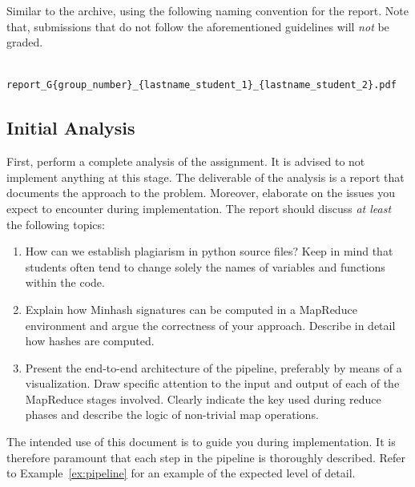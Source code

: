 \documentclass[11pt]{article}
\theoremstyle{definition}
\begin{document}
Similar to the archive, using the following naming convention for the report. Note that, submissions that do not follow the aforementioned guidelines will \emph{not} be graded.

\begin{verbatim}
	report_G{group_number}_{lastname_student_1}_{lastname_student_2}.pdf
\end{verbatim}

\subsection{Initial Analysis}

First, perform a complete analysis of the assignment. It is advised to not implement anything at this stage. The deliverable of the analysis is a report that documents the approach to the problem. Moreover, elaborate on the issues you expect to encounter during implementation. The report should discuss \emph{at least} the following topics:

\begin{enumerate}[label=\textbf{\arabic*}.]
	\item How can we establish plagiarism in python source files? Keep in mind that students often tend to change solely the names of variables and functions within the code.
	
	\item Explain how Minhash signatures can be computed in a MapReduce environment and argue the correctness of your approach. Describe in detail how hashes are computed.
	
	\item Present the end-to-end architecture of the pipeline, preferably by means of a visualization. Draw specific attention to the input and output of each of the MapReduce stages involved. Clearly indicate the key used during reduce phases and describe the logic of non-trivial map operations.
\end{enumerate}

The intended use of this document is to guide you during implementation. It is therefore paramount that each step in the pipeline is thoroughly described. Refer to Example~\ref{ex:pipeline} for an example of the expected level of detail.
\end{document}
